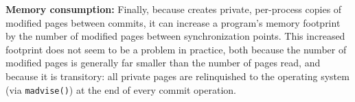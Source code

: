 

\textbf{Memory consumption: }
Finally, because \dthreads{} creates private, per-process copies of
modified pages between commits, it can increase a program's memory
footprint by the number of modified pages between synchronization
points. This increased footprint does not seem to be a problem in
practice, both because the number of modified pages is generally far
smaller than the number of pages read, and because it is transitory:
all private pages are relinquished to the operating system
(via \texttt{madvise()}) at the end of every commit operation.



